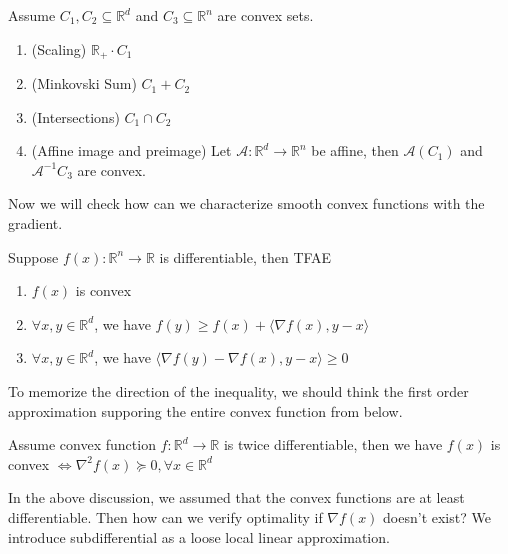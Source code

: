 \begin{lemma}
    Assume $C_1, C_2 \subseteq \mathbb{R}^d$ and $C_3 \subseteq \mathbb{R}^n$ are convex sets.
    \begin{enumerate}
        \item (Scaling) $\mathbb{R}_+ \cdot C_1$
        \item (Minkovski Sum) $C_1 + C_2$
        \item (Intersections) $C_1 \cap C_2$
        \item (Affine image and preimage) Let $\mathcal{A}:\mathbb{R}^d \rightarrow \mathbb{R}^n$ be affine, then $\mathcal{A}(C_1)$ and $\mathcal{A}^{-1}C_3$ are convex.
    \end{enumerate}
\end{lemma}

Now we will check how can we characterize smooth convex functions with the gradient.

\begin{proposition}\label{prop:FirstOrderConvexCharacterization}
    Suppose $f(x): \mathbb{R}^n \rightarrow \mathbb{R}$ is differentiable, then TFAE
    \begin{enumerate}
        \item $f(x)$ is convex
        \item $\forall x,y \in \mathbb{R}^d$, we have $f(y) \geq f(x) + \langle \nabla f(x), y-x \rangle$
        \item $\forall x,y \in \mathbb{R}^d$, we have $\langle \nabla f(y) - \nabla f(x), y-x \rangle \geq 0$
    \end{enumerate}
\end{proposition}

\begin{note}
    To memorize the direction of the inequality, we should think the first order approximation supporing the entire convex function from below. 
\end{note}

\begin{lemma}
    Assume convex function $f: \mathbb{R}^d \rightarrow \mathbb{R}$ is twice differentiable, then we have $f(x)$ is convex $\iff \nabla^2f(x) \succeq 0, \forall x \in \mathbb{R}^d$
\end{lemma}


In the above discussion, we assumed that the convex functions are at least differentiable. Then how can we verify optimality if $\nabla f(x)$ doesn't exist? We introduce subdifferential as a loose local linear approximation.

